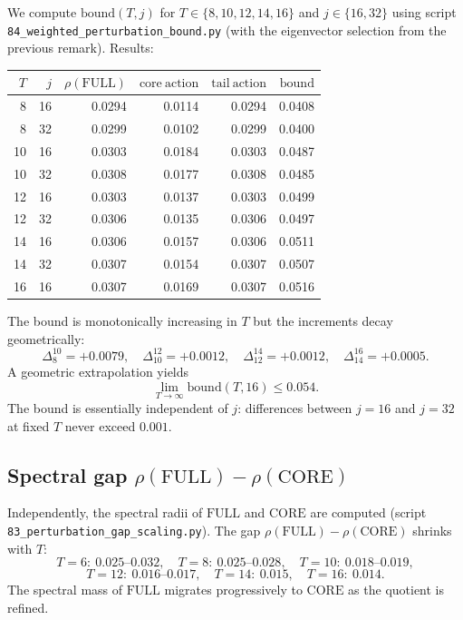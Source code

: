 \documentclass[11pt,a4paper]{article}
\theoremstyle{definition}
\newcommand{\full}{\mathrm{FULL}}
\newcommand{\core}{\mathrm{CORE}}
\newcommand{\spec}{\rho}
\begin{document}
We compute $\mathrm{bound}(T, j)$ for $T \in \{8, 10, 12, 14, 16\}$
and $j \in \{16, 32\}$ using script
\verb|84_weighted_perturbation_bound.py| (with the eigenvector
selection from the previous remark). Results:

\begin{center}
\begin{tabular}{rrrrrr}
\toprule
$T$ & $j$ & $\spec(\full)$ & $\mathrm{core\ action}$ & $\mathrm{tail\ action}$ & $\mathrm{bound}$ \\
\midrule
 8 & 16 & 0.0294 & 0.0114 & 0.0294 & 0.0408 \\
 8 & 32 & 0.0299 & 0.0102 & 0.0299 & 0.0400 \\
10 & 16 & 0.0303 & 0.0184 & 0.0303 & 0.0487 \\
10 & 32 & 0.0308 & 0.0177 & 0.0308 & 0.0485 \\
12 & 16 & 0.0303 & 0.0137 & 0.0303 & 0.0499 \\
12 & 32 & 0.0306 & 0.0135 & 0.0306 & 0.0497 \\
14 & 16 & 0.0306 & 0.0157 & 0.0306 & 0.0511 \\
14 & 32 & 0.0307 & 0.0154 & 0.0307 & 0.0507 \\
16 & 16 & 0.0307 & 0.0169 & 0.0307 & 0.0516 \\
\bottomrule
\end{tabular}
\end{center}

The bound is monotonically increasing in $T$ but the increments
decay geometrically:
\[
\Delta_8^{10} = +0.0079, \quad
\Delta_{10}^{12} = +0.0012, \quad
\Delta_{12}^{14} = +0.0012, \quad
\Delta_{14}^{16} = +0.0005.
\]
A geometric extrapolation yields
\[
\lim_{T \to \infty} \mathrm{bound}(T, 16) \le 0.054.
\]
The bound is essentially independent of $j$: differences between
$j=16$ and $j=32$ at fixed $T$ never exceed $0.001$.

\subsection{Spectral gap $\spec(\full) - \spec(\core)$}

Independently, the spectral radii of $\full$ and $\core$ are
computed (script \verb|83_perturbation_gap_scaling.py|). The gap
$\spec(\full) - \spec(\core)$ shrinks with $T$:
\[
T=6:\ 0.025\text{--}0.032,
\quad
T=8:\ 0.025\text{--}0.028,
\quad
T=10:\ 0.018\text{--}0.019,
\]
\[
T=12:\ 0.016\text{--}0.017,
\quad
T=14:\ 0.015,
\quad
T=16:\ 0.014.
\]
The spectral mass of $\full$ migrates progressively to $\core$ as
the quotient is refined.
\end{document}
